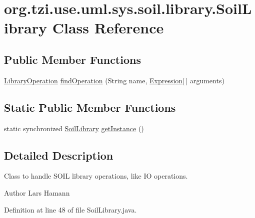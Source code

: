 \hypertarget{classorg_1_1tzi_1_1use_1_1uml_1_1sys_1_1soil_1_1library_1_1_soil_library}{\section{org.\-tzi.\-use.\-uml.\-sys.\-soil.\-library.\-Soil\-Library Class Reference}
\label{classorg_1_1tzi_1_1use_1_1uml_1_1sys_1_1soil_1_1library_1_1_soil_library}
}
\subsection*{Public Member Functions}
\begin{DoxyCompactItemize}
\item 
\hyperlink{interfaceorg_1_1tzi_1_1use_1_1uml_1_1sys_1_1soil_1_1library_1_1_library_operation}{Library\-Operation} \hyperlink{classorg_1_1tzi_1_1use_1_1uml_1_1sys_1_1soil_1_1library_1_1_soil_library_a60441e065018e9e97b6c59c5d1c64c77}{find\-Operation} (String name, \hyperlink{classorg_1_1tzi_1_1use_1_1uml_1_1ocl_1_1expr_1_1_expression}{Expression}\mbox{[}$\,$\mbox{]} arguments)
\end{DoxyCompactItemize}
\subsection*{Static Public Member Functions}
\begin{DoxyCompactItemize}
\item 
static synchronized \hyperlink{classorg_1_1tzi_1_1use_1_1uml_1_1sys_1_1soil_1_1library_1_1_soil_library}{Soil\-Library} \hyperlink{classorg_1_1tzi_1_1use_1_1uml_1_1sys_1_1soil_1_1library_1_1_soil_library_a8f3ed5a8a35b174475c1adfb5a4db644}{get\-Instance} ()
\end{DoxyCompactItemize}


\subsection{Detailed Description}
Class to handle S\-O\-I\-L library operations, like I\-O operations.

\begin{DoxyAuthor}{Author}
Lars Hamann 
\end{DoxyAuthor}


Definition at line 48 of file Soil\-Library.\-java.



